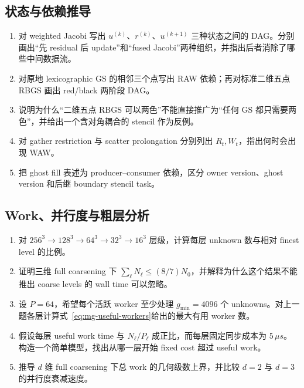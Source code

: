 \subsection*{状态与依赖推导}
\begin{enumerate}[label=\arabic*.]
\item 对 weighted Jacobi 写出 $u^{(k)}$、$r^{(k)}$、$u^{(k+1)}$ 三种状态之间的 DAG。分别画出“先 residual 后 update”和“fused Jacobi”两种组织，并指出后者消除了哪些中间数据流。
\item 对原地 lexicographic GS 的相邻三个点写出 RAW 依赖；再对标准二维五点 RBGS 画出 red/black 两阶段 DAG。
\item 说明为什么“二维五点 RBGS 可以两色”不能直接推广为“任何 GS 都只需要两色”，并给出一个含对角耦合的 stencil 作为反例。
\item 对 gather restriction 与 scatter prolongation 分别列出 $R_t,W_t$，指出何时会出现 WAW。
\item 把 ghost fill 表述为 producer--consumer 依赖，区分 owner version、ghost version 和后继 boundary stencil task。
\end{enumerate}

\subsection*{Work、并行度与粗层分析}
\begin{enumerate}[label=\arabic*.]
\item 对 $256^3\rightarrow128^3\rightarrow64^3\rightarrow32^3\rightarrow16^3$ 层级，计算每层 unknown 数与相对 finest level 的比例。
\item 证明三维 full coarsening 下 $\sum_\ell N_\ell\le(8/7)N_0$，并解释为什么这个结果不能推出 coarse levels 的 wall time 可以忽略。
\item 设 $P=64$，希望每个活跃 worker 至少处理 $g_{\min}=4096$ 个 unknowns。对上一题各层计算式~\eqref{eq:mg-useful-workers}给出的最大有用 worker 数。
\item 假设每层 useful work time 与 $N_\ell/P_\ell$ 成正比，而每层固定同步成本为 $5\,\mu s$。构造一个简单模型，找出从哪一层开始 fixed cost 超过 useful work。
\item 推导 $d$ 维 full coarsening 下总 work 的几何级数上界，并比较 $d=2$ 与 $d=3$ 的并行度衰减速度。
\end{enumerate}

